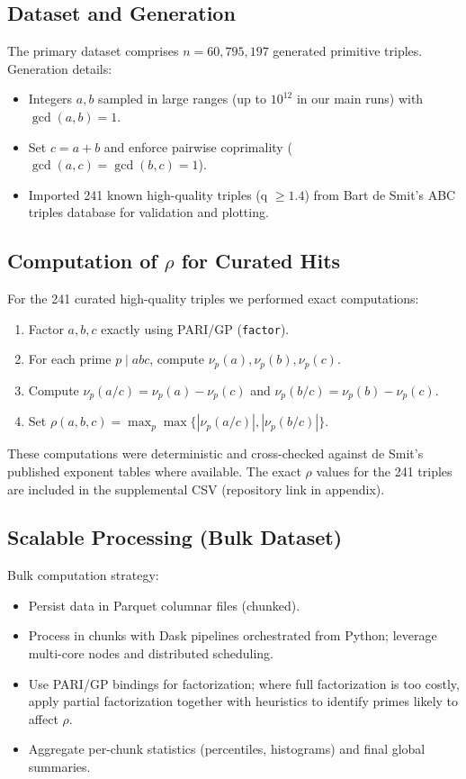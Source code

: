 \documentclass[11pt,a4paper]{article}
\begin{document}
\subsection{Dataset and Generation}
The primary dataset comprises $n=60{,}795{,}197$ generated primitive triples. Generation details:
\begin{itemize}
    \item Integers $a,b$ sampled in large ranges (up to $10^{12}$ in our main runs) with $\gcd(a,b)=1$.
    \item Set $c=a+b$ and enforce pairwise coprimality ($\gcd(a,c)=\gcd(b,c)=1$).
    \item Imported 241 known high-quality triples (q $\ge 1.4$) from Bart de Smit's ABC triples database \cite{desmit} for validation and plotting.
\end{itemize}

\subsection{Computation of \(\rho\) for Curated Hits}
For the 241 curated high-quality triples we performed exact computations:
\begin{enumerate}
    \item Factor $a,b,c$ exactly using PARI/GP (\texttt{factor}).
    \item For each prime $p\mid abc$, compute \(\nu_p(a),\nu_p(b),\nu_p(c)\).
    \item Compute \(\nu_p(a/c)=\nu_p(a)-\nu_p(c)\) and \(\nu_p(b/c)=\nu_p(b)-\nu_p(c)\).
    \item Set \(\rho(a,b,c)=\max_p\max\{|\nu_p(a/c)|,|\nu_p(b/c)|\}\).
\end{enumerate}
These computations were deterministic and cross-checked against de Smit's published exponent tables where available. The exact \(\rho\) values for the 241 triples are included in the supplemental CSV (repository link in appendix).

\subsection{Scalable Processing (Bulk Dataset)}
Bulk computation strategy:
\begin{itemize}
    \item Persist data in Parquet columnar files (chunked).
    \item Process in chunks with Dask pipelines orchestrated from Python; leverage multi-core nodes and distributed scheduling.
    \item Use PARI/GP bindings for factorization; where full factorization is too costly, apply partial factorization together with heuristics to identify primes likely to affect \(\rho\).
    \item Aggregate per-chunk statistics (percentiles, histograms) and final global summaries.
\end{itemize}
\end{document}
